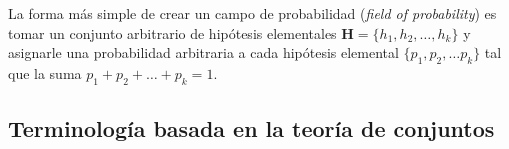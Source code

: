 \documentclass[a4paper,11pt]{book}
\theoremstyle{definition}
\begin{document}

La forma m\'as simple de crear un campo de probabilidad (\emph{field of probability}) es tomar un conjunto arbitrario de hip\'otesis elementales $\textbf{H} = \{h_1, h_2, \dots, h_k\}$
y asignarle una probabilidad arbitraria a cada hip\'otesis elemental $\{p_1, p_2, \dots p_k\}$ tal que la suma $p_1 + p_2 + \dots + p_k = 1$.


\subsection{Terminolog\'ia basada en la teor\'ia de conjuntos}
\end{document}
